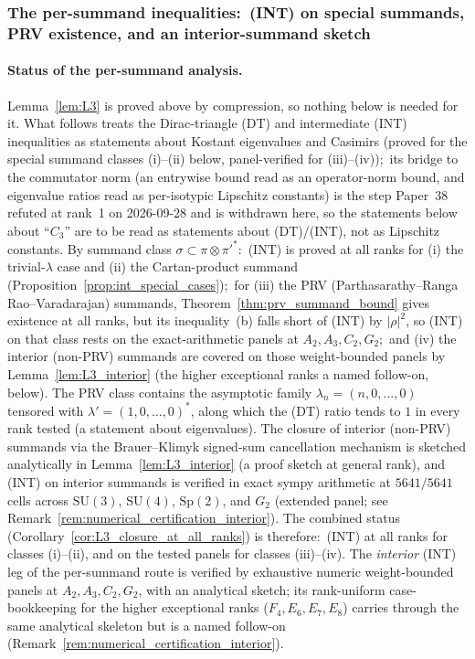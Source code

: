 \documentclass[11pt,a4paper]{article}
\theoremstyle{plain}
\theoremstyle{definition}
\newcommand{\SU}{\mathrm{SU}}
\newcommand{\Sp}{\mathrm{Sp}}
\begin{document}
\subsubsection{The per-summand inequalities:\ (INT) on special summands,
PRV existence, and an interior-summand sketch}\label{sec:L3_analytical}

\paragraph{Status of the per-summand analysis.} Lemma~\ref{lem:L3} is
proved above by compression, so nothing below is needed for it.  What
follows treats the Dirac-triangle (DT) and intermediate (INT)
inequalities as statements about Kostant eigenvalues and Casimirs (proved
for the special summand classes (i)--(ii) below, panel-verified for
(iii)--(iv));\
its bridge to the commutator norm (an entrywise bound read as an
operator-norm bound, and eigenvalue ratios read as per-isotypic
Lipschitz constants) is the step Paper~38 refuted at rank~1 on
2026-09-28 and is withdrawn here, so the statements below about ``$C_3$'' are to be
read as statements about (DT)/(INT), not as Lipschitz constants.  By
summand class $\sigma \subset \pi \otimes \pi'^*$:\ (INT) is proved at all
ranks for (i) the trivial-$\lambda$ case and (ii) the Cartan-product
summand (Proposition~\ref{prop:int_special_cases});\ for (iii) the PRV
(Parthasarathy--Ranga Rao--Varadarajan) summands,
Theorem~\ref{thm:prv_summand_bound} gives existence at all ranks, but its
inequality~(b) falls short of (INT) by $|\rho|^2$, so (INT) on that class
rests on the exact-arithmetic panels at $A_2, A_3, C_2, G_2$;\ and (iv)
the interior (non-PRV) summands are covered on those weight-bounded panels by
Lemma~\ref{lem:L3_interior} (the higher exceptional ranks a named
follow-on, below). The PRV class contains the asymptotic family
$\lambda_n = (n, 0, \ldots, 0)$ tensored with
$\lambda' = (1, 0, \ldots, 0)^*$, along which the (DT) ratio tends to $1$
in every rank tested (a statement about eigenvalues). The closure of interior (non-PRV) summands
via the Brauer--Klimyk signed-sum cancellation mechanism is sketched
analytically in Lemma~\ref{lem:L3_interior} (a proof sketch at general rank),
and (INT) on interior summands is verified in exact sympy arithmetic at
$5641/5641$ cells across $\SU(3)$, $\SU(4)$, $\Sp(2)$, and $G_2$
(extended panel; see Remark~\ref{rem:numerical_certification_interior}).
The combined status (Corollary~\ref{cor:L3_closure_at_all_ranks}) is
therefore:\ (INT) at all ranks for classes (i)--(ii), and on the tested
panels for classes (iii)--(iv). The \emph{interior} (INT)
leg of the per-summand route is verified by exhaustive numeric
weight-bounded panels at $A_2, A_3, C_2, G_2$, with an analytical sketch;
its rank-uniform case-bookkeeping for the higher exceptional ranks
($F_4, E_6, E_7, E_8$) carries through the same analytical skeleton but
is a named follow-on (Remark~\ref{rem:numerical_certification_interior}).
\end{document}
